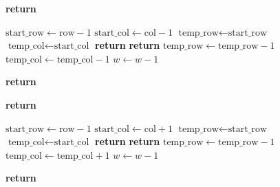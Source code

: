 \documentclass[12pt]{article}
\begin{document}
\begin{algorithmic}
        \State \textbf{return} 
    \EndIf

    \State $\text{start\_row} \gets \text{row} - 1$
    \State $\text{start\_col} \gets \text{col} - 1$
    \State $\text{temp\_row} \gets \text{start\_row}$
    \State $\text{temp\_col} \gets \text{start\_col}$
            \State \textbf{return} 
        \EndIf
            \State \textbf{return} 
        \EndIf
        \State $\text{temp\_row} \gets \text{temp\_row} - 1$
        \State $\text{temp\_col} \gets \text{temp\_col} - 1$
        \State $w \gets w - 1$
    \EndWhile

    \State \textbf{return} 
\EndFunction
\end{algorithmic}
\vfill
\begin{algorithmic}
        \State \textbf{return} 
    \EndIf

    \State $\text{start\_row} \gets \text{row} - 1$
    \State $\text{start\_col} \gets \text{col} + 1$
    \State $\text{temp\_row} \gets \text{start\_row}$
    \State $\text{temp\_col} \gets \text{start\_col}$
            \State \textbf{return} 
        \EndIf
            \State \textbf{return} 
        \EndIf
        \State $\text{temp\_row} \gets \text{temp\_row} - 1$
        \State $\text{temp\_col} \gets \text{temp\_col} + 1$
        \State $w \gets w - 1$
    \EndWhile

    \State \textbf{return} 
\EndFunction
\end{algorithmic}

\vfill
\end{document}
